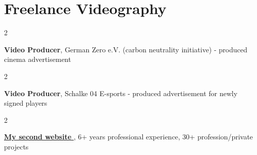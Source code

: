 \documentclass[10pt, letterpaper]{article}
\newenvironment{twocolentry}[2][]{
    \onecolentry
    \def\secondColumn{#2}
    \setcolumnwidth{\fill, 4.5 cm}
    \begin{paracol}{2}
}{
    \switchcolumn \raggedleft \secondColumn
    \end{paracol}
    \endonecolentry
} %
\begin{document}
    \section{Freelance Videography}

        \begin{twocolentry}{
            
        }
            \textbf{Video Producer}, German Zero e.V. (carbon neutrality initiative) - produced cinema advertisement \end{twocolentry}


        \begin{twocolentry}{
            
        }
            \textbf{Video Producer}, Schalke 04 E-sports - produced advertisement for newly signed players \end{twocolentry}

       \begin{twocolentry}{
            
        }
            \href{https://hollbeckg0.wixsite.com/gaborhollbeck}{\underline{\textbf{My second website }}}, 6+ years professional experience, 30+ profession/private projects  \end{twocolentry}

    
\end{document}
